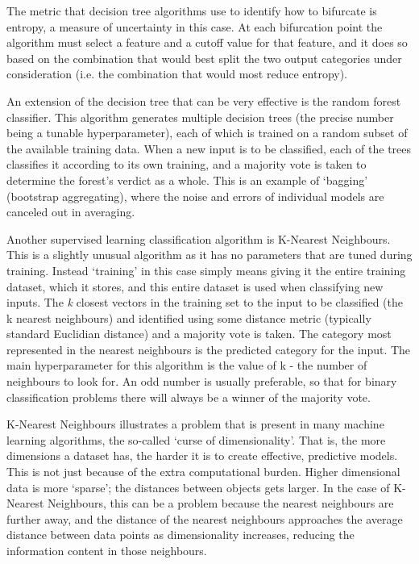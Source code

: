 The metric that decision tree algorithms use to identify how to bifurcate is entropy, a measure of uncertainty in this case. At each bifurcation point the algorithm must select a feature and a cutoff value for that feature, and it does so based on the combination that would best split the two output categories under consideration (i.e. the combination that would most reduce entropy).

An extension of the decision tree that can be very effective is the random forest classifier. This algorithm generates multiple decision trees (the precise number being a tunable hyperparameter), each of which is trained on a random subset of the available training data. When a new input is to be classified, each of the trees classifies it according to its own training, and a majority vote is taken to determine the forest's verdict as a whole. This is an example of `bagging' (bootstrap aggregating), where the noise and errors of individual models are canceled out in averaging.

Another supervised learning classification algorithm is K-Nearest Neighbours. This is a slightly unusual algorithm as it has no parameters that are tuned during training. Instead `training' in this case simply means giving it the entire training dataset, which it stores, and this entire dataset is used when classifying new inputs. The \emph{k} closest vectors in the training set to the input to be classified (the k nearest neighbours) and identified using some distance metric (typically standard Euclidian distance) and a majority vote is taken. The category most represented in the nearest neighbours is the predicted category for the input. The main hyperparameter for this algorithm is the value of k - the number of neighbours to look for. An odd number is usually preferable, so that for binary classification problems there will always be a winner of the majority vote.

K-Nearest Neighbours illustrates a problem that is present in many machine learning algorithms, the so-called `curse of dimensionality'. That is, the more dimensions a dataset has, the harder it is to create effective, predictive models. This is not just because of the extra computational burden. Higher dimensional data is more `sparse'; the distances between objects gets larger. In the case of K-Nearest Neighbours, this can be a problem because the nearest neighbours are further away, and the distance of the nearest neighbours approaches the average distance between data points as dimensionality increases, reducing the information content in those neighbours.

